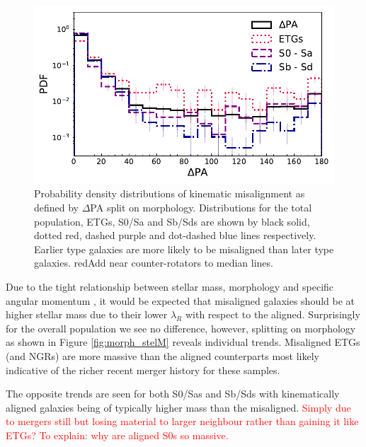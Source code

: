 \documentclass[fleqn,usenatbib]{mnras}
\newcommand{\red}[1]{{\textcolor{red}{#1}}}
\begin{document}
\begin{figure}
	\includegraphics[width=\linewidth]{morph/delPA_morph.pdf}
    \caption{Probability density distributions of kinematic misalignment as defined by $\Delta$PA split on morphology. Distributions for the total population, ETGs, S0/Sa and Sb/Sds are shown by black solid, dotted red, dashed purple and dot-dashed blue lines respectively. Earlier type galaxies are more likely to be misaligned than later type galaxies. red{Add near counter-rotators to median lines.}}
    \label{fig:morph_PA}
\end{figure}

Due to the tight relationship between stellar mass, morphology and specific angular momentum \citep[e.g. see;]{cortese2016}, it would be expected that misaligned galaxies should be at higher stellar mass due to their lower $\lambda_{R}$ with respect to the aligned. Surprisingly for the overall population we see no difference, however, splitting on morphology as shown in Figure \ref{fig:morph_stelM} reveals individual trends. Misaligned ETGs (and NGRs) are more massive than the aligned counterparts most likely indicative of the richer recent merger history for these samples. 

The opposite trends are seen for both S0/Sas and Sb/Sds with kinematically aligned galaxies being of typically higher mass than the misaligned. \red{Simply due to mergers still but losing material to larger neighbour rather than gaining it like ETGs? To explain: why are aligned S0s so massive.} 
\end{document}
